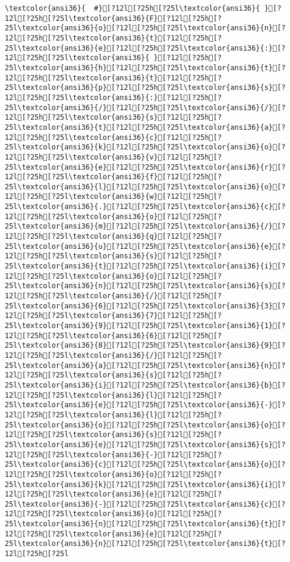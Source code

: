 \documentclass{scrartcl}
\begin{document}
\begin{Verbatim}
\textcolor{ansi36}{  #}[?12l[?25h[?25l\textcolor{ansi36}{ }[?12l[?25h[?25l\textcolor{ansi36}{F}[?12l[?25h[?25l\textcolor{ansi36}{o}[?12l[?25h[?25l\textcolor{ansi36}{n}[?12l[?25h[?25l\textcolor{ansi36}{t}[?12l[?25h[?25l\textcolor{ansi36}{e}[?12l[?25h[?25l\textcolor{ansi36}{:}[?12l[?25h[?25l\textcolor{ansi36}{ }[?12l[?25h[?25l\textcolor{ansi36}{h}[?12l[?25h[?25l\textcolor{ansi36}{t}[?12l[?25h[?25l\textcolor{ansi36}{t}[?12l[?25h[?25l\textcolor{ansi36}{p}[?12l[?25h[?25l\textcolor{ansi36}{s}[?12l[?25h[?25l\textcolor{ansi36}{:}[?12l[?25h[?25l\textcolor{ansi36}{/}[?12l[?25h[?25l\textcolor{ansi36}{/}[?12l[?25h[?25l\textcolor{ansi36}{s}[?12l[?25h[?25l\textcolor{ansi36}{t}[?12l[?25h[?25l\textcolor{ansi36}{a}[?12l[?25h[?25l\textcolor{ansi36}{c}[?12l[?25h[?25l\textcolor{ansi36}{k}[?12l[?25h[?25l\textcolor{ansi36}{o}[?12l[?25h[?25l\textcolor{ansi36}{v}[?12l[?25h[?25l\textcolor{ansi36}{e}[?12l[?25h[?25l\textcolor{ansi36}{r}[?12l[?25h[?25l\textcolor{ansi36}{f}[?12l[?25h[?25l\textcolor{ansi36}{l}[?12l[?25h[?25l\textcolor{ansi36}{o}[?12l[?25h[?25l\textcolor{ansi36}{w}[?12l[?25h[?25l\textcolor{ansi36}{.}[?12l[?25h[?25l\textcolor{ansi36}{c}[?12l[?25h[?25l\textcolor{ansi36}{o}[?12l[?25h[?25l\textcolor{ansi36}{m}[?12l[?25h[?25l\textcolor{ansi36}{/}[?12l[?25h[?25l\textcolor{ansi36}{q}[?12l[?25h[?25l\textcolor{ansi36}{u}[?12l[?25h[?25l\textcolor{ansi36}{e}[?12l[?25h[?25l\textcolor{ansi36}{s}[?12l[?25h[?25l\textcolor{ansi36}{t}[?12l[?25h[?25l\textcolor{ansi36}{i}[?12l[?25h[?25l\textcolor{ansi36}{o}[?12l[?25h[?25l\textcolor{ansi36}{n}[?12l[?25h[?25l\textcolor{ansi36}{s}[?12l[?25h[?25l\textcolor{ansi36}{/}[?12l[?25h[?25l\textcolor{ansi36}{6}[?12l[?25h[?25l\textcolor{ansi36}{3}[?12l[?25h[?25l\textcolor{ansi36}{7}[?12l[?25h[?25l\textcolor{ansi36}{9}[?12l[?25h[?25l\textcolor{ansi36}{1}[?12l[?25h[?25l\textcolor{ansi36}{6}[?12l[?25h[?25l\textcolor{ansi36}{8}[?12l[?25h[?25l\textcolor{ansi36}{9}[?12l[?25h[?25l\textcolor{ansi36}{/}[?12l[?25h[?25l\textcolor{ansi36}{a}[?12l[?25h[?25l\textcolor{ansi36}{n}[?12l[?25h[?25l\textcolor{ansi36}{s}[?12l[?25h[?25l\textcolor{ansi36}{i}[?12l[?25h[?25l\textcolor{ansi36}{b}[?12l[?25h[?25l\textcolor{ansi36}{l}[?12l[?25h[?25l\textcolor{ansi36}{e}[?12l[?25h[?25l\textcolor{ansi36}{-}[?12l[?25h[?25l\textcolor{ansi36}{l}[?12l[?25h[?25l\textcolor{ansi36}{o}[?12l[?25h[?25l\textcolor{ansi36}{o}[?12l[?25h[?25l\textcolor{ansi36}{s}[?12l[?25h[?25l\textcolor{ansi36}{e}[?12l[?25h[?25l\textcolor{ansi36}{s}[?12l[?25h[?25l\textcolor{ansi36}{-}[?12l[?25h[?25l\textcolor{ansi36}{c}[?12l[?25h[?25l\textcolor{ansi36}{o}[?12l[?25h[?25l\textcolor{ansi36}{o}[?12l[?25h[?25l\textcolor{ansi36}{k}[?12l[?25h[?25l\textcolor{ansi36}{i}[?12l[?25h[?25l\textcolor{ansi36}{e}[?12l[?25h[?25l\textcolor{ansi36}{-}[?12l[?25h[?25l\textcolor{ansi36}{c}[?12l[?25h[?25l\textcolor{ansi36}{o}[?12l[?25h[?25l\textcolor{ansi36}{n}[?12l[?25h[?25l\textcolor{ansi36}{t}[?12l[?25h[?25l\textcolor{ansi36}{e}[?12l[?25h[?25l\textcolor{ansi36}{n}[?12l[?25h[?25l\textcolor{ansi36}{t}[?12l[?25h[?25l

\end{Verbatim}
\end{document}
